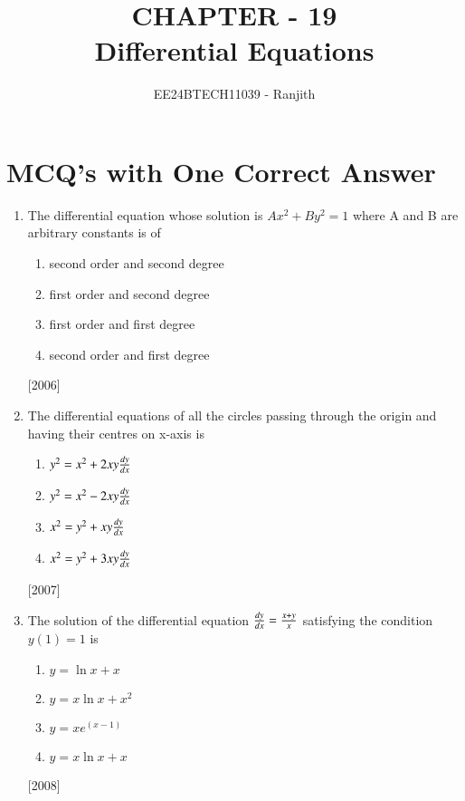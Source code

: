 \documentclass[journal,12pt,twocolumn]{IEEEtran}
\theoremstyle{remark}
\begin{document}

\vspace{3cm}

\title{CHAPTER - 19\\Differential Equations}
\author{EE24BTECH11039 - Ranjith}
\maketitle
\newpage
\bigskip

\renewcommand{\thefigure}{\theenumi}
\renewcommand{\thetable}{\theenumi}


\section{MCQ's with One Correct Answer}

\begin{enumerate}
\item The differential equation whose solution is $Ax^2 + By^2 = 1$ where A and B are arbitrary constants is of 



\begin{enumerate}
\item second order and second degree 
\item first order and second degree 
\item first order and first degree 
\item second order and first degree 

\end{enumerate}
\hfill
{[2006]}
\item The differential equations of all the circles passing through the origin and having their centres on x-axis is

\begin{enumerate}
\item $ y^2=x^2 + 2xy\frac{d{y}}{d{x}} $
\item $ y^2=x^2 - 2xy\frac{d{y}}{d{x}}$
\item $ x^2=y^2 + xy\frac{d{y}}{d{x}}$
\item $ x^2 =y^2 + 3xy\frac{d{y}}{d{x}}$
\end{enumerate}
\hfill
{{[2007]}}




\item The solution of the differential equation $ \frac{d{y}}{d{x}}=\frac{x+y}{x}$ satisfying the condition $ y(1)=1 $ is
\begin{enumerate}
\item $ y=  \ln{x}+x $
\item $y=x\ln{x}+x^2$
\item $ y=xe^{(x-1)} $
\item $ y=x \ln{x}+ x$
\end{enumerate}
\hfill
{[2008]}



\end{enumerate}
\end{document}
